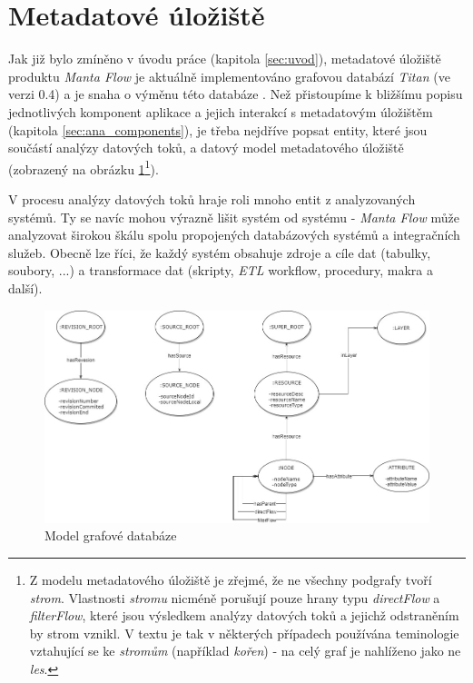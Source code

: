 \section{Metadatové úložiště}
\label{sec:ana_model}
Jak již bylo zmíněno v úvodu práce (kapitola \ref{sec:uvod}), metadatové úložiště produktu \textit{Manta Flow} je aktuálně implementováno grafovou databází \textit{Titan} (ve verzi 0.4) a je snaha o výměnu této databáze \cite{Kovar18}.
Než přistoupíme k bližšímu popisu jednotlivých komponent aplikace a jejich interakcí s metadatovým úložištěm (kapitola \ref{sec:ana_components}), je třeba nejdříve popsat entity, které jsou součástí analýzy datových toků, a datový model metadatového úložiště (zobrazený na obrázku \ref{fig:ana-model}\footnote{Z modelu metadatového úložiště je zřejmé, že ne všechny podgrafy tvoří \textit{strom}. Vlastnosti \textit{stromu} nicméně porušují pouze hrany typu \textit{directFlow} a \textit{filterFlow}, které jsou výsledkem analýzy datových toků a jejichž odstraněním by strom vznikl. V textu je tak v některých případech používána teminologie vztahující se ke \textit{stromům} (například \textit{kořen}) - na celý graf je nahlíženo jako ne \textit{les}.}).

V procesu analýzy datových toků hraje roli mnoho entit z analyzovaných systémů. Ty se navíc mohou výrazně lišit systém od systému - \textit{Manta Flow} může analyzovat širokou škálu spolu propojených databázových systémů a integračních služeb. Obecně lze říci, že každý systém obsahuje zdroje a cíle dat (tabulky, soubory, ...) a transformace dat (skripty, \textit{ETL} workflow, procedury, makra a další).

\begin{figure}
\begin{center}
\includegraphics[width=14cm]{figures/model}
\caption{Model grafové databáze}
\label{fig:ana-model}
\end{center}
\end{figure}

